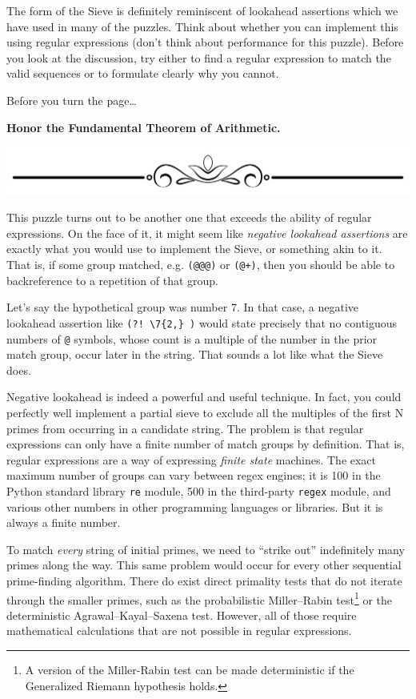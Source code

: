 \newpage

The form of the Sieve is definitely reminiscent of lookahead assertions
which we have used in many of the puzzles. Think about whether you can
implement this using regular expressions (don't think about performance
for this puzzle). Before you look at the discussion, try either to find
a regular expression to match the valid sequences or to formulate
clearly why you cannot.

Before you turn the page\ldots{}

\textbf{Honor the Fundamental Theorem of Arithmetic.}

\includegraphics{images/Elegant-Flourish-Frame-Extrapolated-19.svg}

\newpage

This puzzle turns out to be another one that exceeds the ability of
regular expressions. On the face of it, it might seem like
\emph{negative lookahead assertions} are exactly what you would use to
implement the Sieve, or something akin to it. That is, if some group
matched, e.g. \texttt{(@@@)} or \texttt{(@+)}, then you should be able
to backreference to a repetition of that group.

Let's say the hypothetical group was number 7. In that case, a negative
lookahead assertion like \texttt{(?!\ \textbackslash{}7\{2,\}\ )} would
state precisely that no contiguous numbers of \texttt{@} symbols, whose
count is a multiple of the number in the prior match group, occur later
in the string. That sounds a lot like what the Sieve does.

Negative lookahead is indeed a powerful and useful technique. In fact,
you could perfectly well implement a partial sieve to exclude all the
multiples of the first N primes from occurring in a candidate string.
The problem is that regular expressions can only have a finite number of
match groups by definition. That is, regular expressions are a way of
expressing \emph{finite state} machines. The exact maximum number of
groups can vary between regex engines; it is 100 in the Python standard
library \texttt{re} module, 500 in the third-party \texttt{regex}
module, and various other numbers in other programming languages or
libraries. But it is always a finite number.

To match \emph{every} string of initial primes, we need to ``strike
out'' indefinitely many primes along the way. This same problem would
occur for every other sequential prime-finding algorithm. There do exist
direct primality tests that do not iterate through the smaller primes,
such as the probabilistic Miller--Rabin test\footnote{A version of the
  Miller-Rabin test can be made deterministic if the Generalized Riemann
  hypothesis holds.} or the deterministic Agrawal--Kayal--Saxena test.
However, all of those require mathematical calculations that are not
possible in regular expressions.

